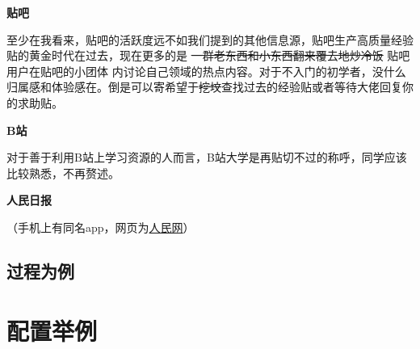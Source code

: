 \documentclass[12pt]{article}
\begin{document}
\textbf{贴吧}

至少在我看来，贴吧的活跃度远不如我们提到的其他信息源，贴吧生产高质量经验贴的黄金时代在过去，现在更多的是
\sout{一群老东西和小东西翻来覆去地炒冷饭}
贴吧用户在贴吧的小团体
内讨论自己领域的热点内容。对于不入门的初学者，没什么归属感和体验感在。倒是可以寄希望于\sout{挖坟}查找过去的经验贴或者等待大佬回复你的求助贴。

\textbf{B站}

对于善于利用B站上学习资源的人而言，B站大学是再贴切不过的称呼，同学应该比较熟悉，不再赘述。

\textbf{人民日报}

（手机上有同名app，网页为\href{http://www.people.cn/}{人民网}）
\subsection{过程为例}

\section{配置举例}
\end{document}
